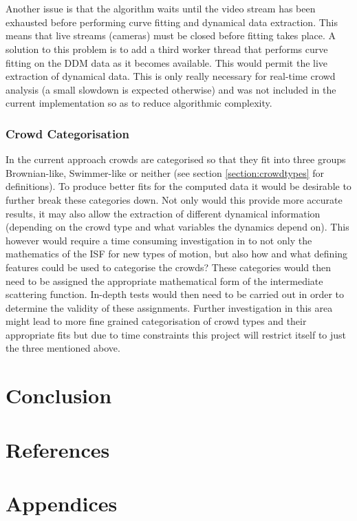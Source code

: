 \documentclass[11pt]{article}
\begin{document}
\\\\
Another issue is that the algorithm waits until the video stream has been exhausted before performing curve fitting and dynamical data extraction. This means that live streams (cameras) must be closed before fitting takes place. A solution to this problem is to add a third worker thread that performs curve fitting on the DDM data as it becomes available. This would permit the live extraction of dynamical data. This is only really necessary for real-time crowd analysis (a small slowdown is expected otherwise) and was not included in the current implementation so as to reduce algorithmic complexity.
\subsubsection{Crowd Categorisation}
In the current approach crowds are categorised so that they fit into three groups Brownian-like, Swimmer-like or neither (see section \ref{section:crowdtypes} for definitions). To produce better fits for the computed data it would be desirable to further break these categories down. Not only would this provide more accurate results, it may also allow the extraction of different dynamical information (depending on the crowd type and what variables the dynamics depend on). This however would require a time consuming investigation in to not only the mathematics of the ISF for new types of motion, but also how and what defining features could be used to categorise the crowds? These categories would then need to be assigned the appropriate mathematical form of the intermediate scattering function. In-depth tests would then need to be carried out in order to determine the validity of these assignments. Further investigation in this area might lead to more fine grained categorisation of crowd types and their appropriate fits but due to time constraints this project will restrict itself to just the three mentioned above.

\clearpage
\section{Conclusion}


\clearpage
\section{References}
\printbibliography[heading=none]

\clearpage
\section{Appendices}
\end{document}

